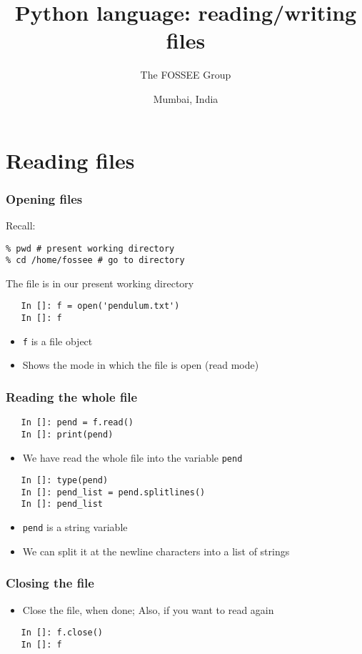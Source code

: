 \documentclass[14pt,compress]{beamer}
\title[Files]{Python language: reading/writing files}
\author[FOSSEE Team] {The FOSSEE Group}
\institute[IIT Bombay] {Department of Aerospace Engineering\\IIT Bombay}
\date[] {Mumbai, India}
\begin{document}
\begin{frame}
  \titlepage
\end{frame}

\section{Reading files}

\begin{frame}[fragile]
  \frametitle{Opening files}
  Recall:
  \begin{lstlisting}
% pwd # present working directory
% cd /home/fossee # go to directory
  \end{lstlisting}
  {\small The file is in our present working directory}
  \begin{lstlisting}
   In []: f = open('pendulum.txt')
   In []: f
  \end{lstlisting}
  \begin{itemize}
  \item \texttt{f} is a file object
  \item Shows the mode in which the file is open (read mode)
  \end{itemize}
\end{frame}

\begin{frame}[fragile]
 \frametitle{Reading the whole file}
  \begin{lstlisting}
   In []: pend = f.read()
   In []: print(pend)
  \end{lstlisting}
  \begin{itemize}
  \item We have read the whole file into the variable \texttt{pend}
  \end{itemize}
  \begin{lstlisting}
   In []: type(pend)
   In []: pend_list = pend.splitlines()
   In []: pend_list
  \end{lstlisting}
  \begin{itemize}
  \item  \texttt{pend} is a string variable
  \item We can split it at the newline characters into a list of
    strings
  \end{itemize}
\end{frame}

\begin{frame}[fragile]
 \frametitle{Closing the file}
 \begin{itemize}
  \item Close the file, when done; Also, if you want to read again
  \end{itemize}
  \begin{lstlisting}
   In []: f.close()
   In []: f
 \end{lstlisting}
\end{frame}
\end{document}
